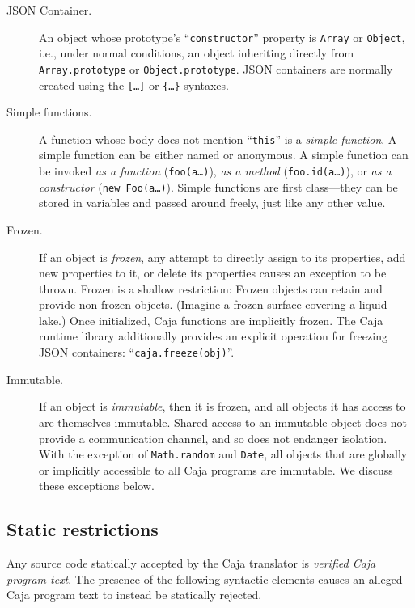 \documentclass[letterpaper,twocolumn,10pt]{article}
\newcommand{\code}[1]{{\tt {#1}}}              %
\begin{document}
\begin{description}

  \item[JSON Container.] An object whose prototype's ``\code{constructor}'' 
  property is \code{Array} or \code{Object}, i.e., under normal conditions, 
  an object inheriting directly from \code{Array.prototype} or 
  \code{Object.prototype}. JSON containers are normally created using the
  \code{[\ldots]} or \code{\{\ldots\}} syntaxes.

  \item[Simple functions.] A function whose body does not mention 
  ``\code{this}'' is a \emph{simple function}. A simple function can be 
  either named or anonymous. A simple function can be invoked \emph{as a 
  function} (\code{foo(a\ldots)}), \emph{as a method} 
  (\code{foo.id(a\ldots)}), or \emph{as a constructor} (\code{new 
  Foo(a\ldots)}). Simple functions are first class---they can be stored in 
  variables and passed around freely, just like any other value.
  
  \item[Frozen.] If an object is \emph{frozen}, any attempt to directly 
  assign to its properties, add new properties to it, or delete its 
  properties causes an exception to be thrown. Frozen is a shallow 
  restriction: Frozen objects can retain and provide non-frozen objects. 
  (Imagine a frozen surface covering a liquid lake.) Once initialized, Caja 
  functions are implicitly frozen. The Caja runtime library additionally 
  provides an explicit operation for freezing JSON containers: 
  ``\code{caja.freeze(obj)}''.
  
  \item[Immutable.] If an object is \emph{immutable}, then it is frozen, and 
  all objects it has access to are themselves immutable. Shared access to an 
  immutable object does not provide a communication channel, and so does not 
  endanger isolation. With the exception of \code{Math.random} and 
  \code{Date}, all objects that are globally or implicitly accessible to all 
  Caja programs are immutable. We discuss these exceptions below.

\end{description}

\subsection{Static restrictions}

Any source code statically accepted by the Caja translator is \emph{verified 
Caja program text}. The presence of the following syntactic elements causes 
an alleged Caja program text to instead be statically rejected.
\end{document}
